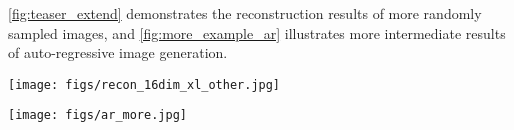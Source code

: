 \documentclass[10pt,twocolumn,letterpaper]{article}
\DeclareRobustCommand{\modelname}{\textsc{Semanticist}\xspace}
\begin{document}
\cref{fig:teaser_extend} demonstrates the reconstruction results of more randomly sampled images, and \cref{fig:more_example_ar} illustrates more intermediate results of auto-regressive image generation.

\begin{figure*}[t]
    \centering
    \texttt{[image: figs/recon\_16dim\_xl\_other.jpg]}
    \caption{More reconstruction results of \modelname autoencoder (with d16$\times$256 concepts tokens and DiT-XL/2 decoder).}
    \label{fig:teaser_extend}
\end{figure*}


\begin{figure*}
    \centering
    \texttt{[image: figs/ar\_more.jpg]}
    \caption{More visualization of intermediate results of auto-regressive image generation.}
    \label{fig:more_example_ar}
\end{figure*} 
\end{document}
